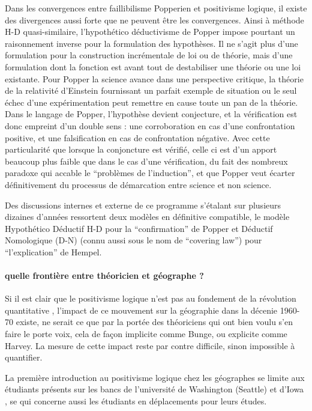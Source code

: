 Dans les convergences entre faillibilisme Popperien et positivisme logique, il existe des divergences aussi forte que ne peuvent être les convergences. Ainsi à méthode H-D quasi-similaire, l'hypothético déductivisme de Popper impose pourtant un raisonnement inverse pour la formulation des hypothèses. Il ne s'agit plus d'une formulation pour la construction incrémentale de loi ou de théorie, mais d'une formulation dont la fonction est avant tout de destabiliser une théorie ou une loi existante. Pour Popper la science avance dans une perspective critique, la théorie de la relativité d'Einstein fournissant un parfait exemple de situation ou le seul échec d'une expérimentation peut remettre en cause toute un pan de la théorie. Dans le langage de Popper, l'hypothèse devient conjecture, et la vérification est donc empreint d'un double sens : une corroboration en cas d'une confrontation positive, et une falsification en cas de confrontation négative. Avec cette particularité que lorsque la conjoncture est vérifié, celle ci est d'un apport beaucoup plus faible que dans le cas d'une vérification, du fait des nombreux paradoxe qui accable le \enquote{problèmes de l'induction}, et que Popper veut écarter définitivement du processus de démarcation entre science et non science.

Des discussions internes et externe de ce programme s'étalant sur plusieurs dizaines d'années ressortent deux modèles en définitive compatible, le modèle Hypothético Déductif H-D pour la \enquote{confirmation} de Popper et Déductif Nomologique (D-N) (connu aussi sous le nom de \foreignquote{english}{covering law}) pour \enquote{l'explication} de Hempel.

\paragraph{quelle frontière entre théoricien et géographe ?}
 
Si il est clair que le positivisme logique n'est pas au fondement de la révolution quantitative \autocite{Claval2003}, l'impact de ce mouvement sur la géographie dans la décenie 1960-70 existe, ne serait ce que par la portée des théoriciens qui ont bien voulu s'en faire le porte voix, cela de façon implicite comme Bunge, ou explicite comme Harvey. La mesure de cette impact reste par contre difficile, sinon impossible à quantifier. 

La première introduction au positivisme logique chez les géographes se limite aux étudiants présents sur les bancs de l'université de Washington (Seattle) et d'Iowa \autocite[554]{Barnes2001a} \autocite[120-121]{Unwin1992}, se qui concerne aussi les étudiants en déplacements pour leurs études.

